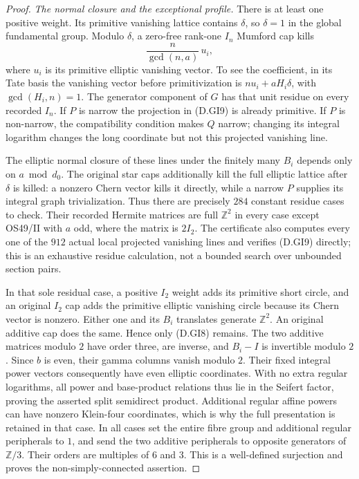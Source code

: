 \begin{proof}
\emph{The normal closure and the exceptional profile.}
There is at least one positive weight. Its primitive
vanishing lattice contains $\delta$, so $\delta=1$
in the global fundamental group. Modulo $\delta$,
a zero-free rank-one $I_n$ Mumford cap kills
\[
                   \frac{n}{\gcd(n,a)}\,u_i,              \tag{D.GI9}
\]
where $u_i$ is its primitive elliptic vanishing vector.
To see the coefficient, in its Tate basis the
vanishing vector before primitivization is
$nu_i+aH_i\delta$, with
$\gcd(H_i,n)=1$. The generator component of $G$
has that unit residue on every recorded $I_n$.
If $P$ is narrow the projection in (D.GI9) is
already primitive. If $P$ is non-narrow, the
compatibility condition makes $Q$ narrow; changing
its integral logarithm changes the long coordinate
but not this projected vanishing line.

The elliptic normal closure of these lines under
the finitely many $B_i$ depends only on
$a\bmod d_0$. The original star caps additionally
kill the full elliptic lattice after $\delta$ is
killed: a nonzero Chern vector kills it directly,
while a narrow $P$ supplies its integral graph
trivialization. Thus there are precisely $284$
constant residue cases to check. Their recorded
Hermite matrices are full $\mathbb Z^2$ in every
case except OS49/II with $a$ odd, where the matrix
is $2I_2$. The certificate also computes every
one of the $912$ actual local projected vanishing
lines and verifies (D.GI9) directly; this is an
exhaustive residue calculation, not a bounded
search over unbounded section pairs.

In that sole residual case, a positive $I_2$
weight adds its primitive short circle, and an
original $I_2$ cap adds the primitive elliptic
vanishing circle because its Chern vector is
nonzero. Either one and its $B_i$ translates
generate $\mathbb Z^2$. An original additive
cap does the same. Hence only (D.GI8) remains.
The two additive matrices modulo $2$ have order
three, are inverse, and $B_i-I$ is invertible
modulo $2$. Since $b$ is even, their gamma
columns vanish modulo $2$. Their fixed integral
power vectors consequently have even elliptic
coordinates. With no extra regular logarithms,
all power and base-product relations thus lie
in the Seifert factor, proving the asserted
split semidirect product. Additional regular
affine powers can have nonzero Klein-four
coordinates, which is why the full presentation
is retained in that case. In all cases set
the entire fibre group and additional regular
peripherals to $1$, and send the two additive
peripherals to opposite generators of $\mathbb Z/3$.
Their orders are multiples of $6$ and $3$.
This is a well-defined surjection and proves
the non-simply-connected assertion.


\end{proof}
